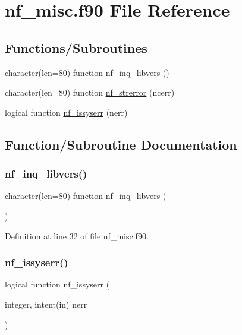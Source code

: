 \hypertarget{nf__misc_8f90}{}\section{nf\+\_\+misc.\+f90 File Reference}
\label{nf__misc_8f90}
\subsection*{Functions/\+Subroutines}
\begin{DoxyCompactItemize}
\item 
character(len=80) function \hyperlink{nf__misc_8f90_ad8d572386952b62a84e97b0e183fc60e}{nf\+\_\+inq\+\_\+libvers} ()
\item 
character(len=80) function \hyperlink{nf__misc_8f90_a5dc92cfb84f35ead3ef8cb519ee515e6}{nf\+\_\+strerror} (ncerr)
\item 
logical function \hyperlink{nf__misc_8f90_a95155aa42575fd947a3dfe3b047b447e}{nf\+\_\+issyserr} (nerr)
\end{DoxyCompactItemize}


\subsection{Function/\+Subroutine Documentation}
\mbox{\label{nf__misc_8f90_ad8d572386952b62a84e97b0e183fc60e}} 
\subsubsection{\texorpdfstring{nf\+\_\+inq\+\_\+libvers()}{nf\_inq\_libvers()}}
{\footnotesize\ttfamily character(len=80) function nf\+\_\+inq\+\_\+libvers (\begin{DoxyParamCaption}{ }\end{DoxyParamCaption})}



Definition at line 32 of file nf\+\_\+misc.\+f90.

\mbox{\label{nf__misc_8f90_a95155aa42575fd947a3dfe3b047b447e}} 
\subsubsection{\texorpdfstring{nf\+\_\+issyserr()}{nf\_issyserr()}}
{\footnotesize\ttfamily logical function nf\+\_\+issyserr (\begin{DoxyParamCaption}\item[{integer, intent(in)}]{nerr }\end{DoxyParamCaption})}




